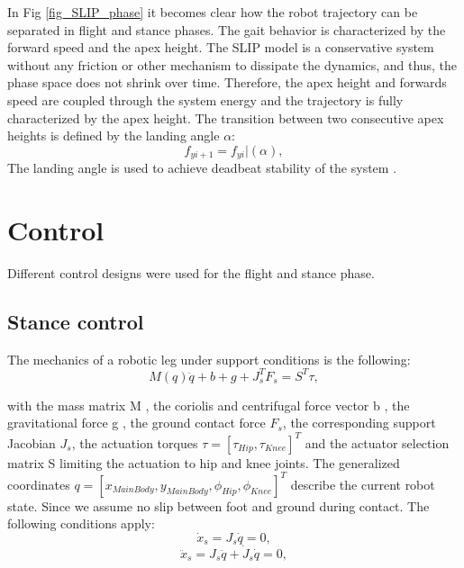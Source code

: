 \documentclass[10pt,conference]{IEEEtran}
\begin{document}
In Fig \ref{fig_SLIP_phase} it becomes clear how the robot trajectory can be separated in flight and stance phases. The gait behavior is characterized by the forward speed and the apex height.
The SLIP model is a conservative system without any friction or other mechanism to dissipate the dynamics, and thus, the phase space does not shrink over time. 
Therefore, the apex height and forwards speed are coupled through the system energy and the trajectory is fully characterized by the apex height. 
The transition between two consecutive apex heights is defined by the landing angle \(\alpha\):
\begin{equation}
   {f}_{yi+1}={f}_{yi}|(\alpha),
\end{equation}
The landing angle is used to achieve deadbeat stability of the system \cite{Wu2014} \cite{Hutter2010}.




\section{Control}
\label{sec:Control}
Different control designs were used for the flight and stance phase. 

\subsection{Stance control}
The mechanics of a robotic leg under support conditions is the following:
\begin{equation}
   M(q)\ddot{q}+b+g+{J}_{s}^{T}F_{s}=S^{T}{\tau},
\end{equation}

with the mass matrix M , the coriolis and centrifugal force vector b , the gravitational force g , the ground contact force
$F_s$, the corresponding support Jacobian \({J}_{s}\), the actuation torques \(\tau = [{\tau}_{Hip}, {\tau}_{Knee}]^{T}\) and the actuator selection matrix S
limiting the actuation to hip and knee joints. The generalized coordinates  \(q = [x_{MainBody}, y_{MainBody}, {\phi}_{Hip}, {\phi}_{Knee}]^{T}\)
describe the current robot state. Since we assume no slip between foot and ground during contact. The following conditions apply: 
\begin{equation}
   \dot{x}_{s} = J_{s} \dot{q} = 0,
\end{equation}
\begin{equation}
   \ddot{x}_{s} = J_{s} \ddot{q} + \dot{J}_{s} \dot{q}=0,
\end{equation}
\end{document}
